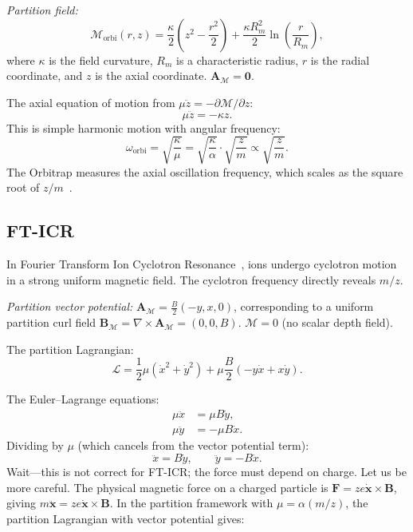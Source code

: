\documentclass[11pt,twocolumn,a4paper]{article}
\theoremstyle{definition}
\theoremstyle{remark}
\newcommand{\Depth}{\mathcal{M}}
\newcommand{\partinert}{\mu}
\newcommand{\Apartition}{\mathbf{A}_{\mathcal{M}}}
\newcommand{\Lagr}{\mathcal{L}}
\begin{document}
\emph{Partition field:}
\[
  \Depth_{\mathrm{orbi}}(r, z) = \frac{\kappa}{2}\left(z^2 - \frac{r^2}{2}\right) + \frac{\kappa R_m^2}{2}\ln\left(\frac{r}{R_m}\right),
\]
where $\kappa$ is the field curvature, $R_m$ is a characteristic radius, $r$ is the radial coordinate, and $z$ is the axial coordinate. $\Apartition = \mathbf{0}$.

The axial equation of motion from $\partinert \ddot{z} = -\partial\Depth/\partial z$:
\[
  \partinert \ddot{z} = -\kappa z.
\]
This is simple harmonic motion with angular frequency:
\begin{equation}
\label{eq:orbitrap}
  \boxed{\omega_{\mathrm{orbi}} = \sqrt{\frac{\kappa}{\partinert}} = \sqrt{\frac{\kappa}{\alpha}} \cdot \sqrt{\frac{z}{m}} \propto \sqrt{\frac{z}{m}}}.
\end{equation}
The Orbitrap measures the axial oscillation frequency, which scales as the square root of $z/m$~\citep{makarov2000}.

\subsection{FT-ICR}
\label{sec:fticr}

In Fourier Transform Ion Cyclotron Resonance~\citep{marshall1998}, ions undergo cyclotron motion in a strong uniform magnetic field. The cyclotron frequency directly reveals $m/z$.

\emph{Partition vector potential:} $\Apartition = \frac{B}{2}(-y, x, 0)$, corresponding to a uniform partition curl field $\mathbf{B}_\Depth = \nabla \times \Apartition = (0, 0, B)$. $\Depth = 0$ (no scalar depth field).

The partition Lagrangian:
\[
  \Lagr = \frac{1}{2}\partinert(\dot{x}^2 + \dot{y}^2) + \partinert \frac{B}{2}(-y\dot{x} + x\dot{y}).
\]

The Euler--Lagrange equations:
\begin{align}
  \partinert \ddot{x} &= \partinert B \dot{y}, \\
  \partinert \ddot{y} &= -\partinert B \dot{x}.
\end{align}
Dividing by $\partinert$ (which cancels from the vector potential term):
\[
  \ddot{x} = B\dot{y}, \qquad \ddot{y} = -B\dot{x}.
\]
Wait---this is not correct for FT-ICR; the force must depend on charge. Let us be more careful. The physical magnetic force on a charged particle is $\mathbf{F} = ze\dot{\mathbf{x}} \times \mathbf{B}$, giving $m\ddot{\mathbf{x}} = ze\dot{\mathbf{x}} \times \mathbf{B}$. In the partition framework with $\partinert = \alpha(m/z)$, the partition Lagrangian with vector potential gives:
\end{document}
